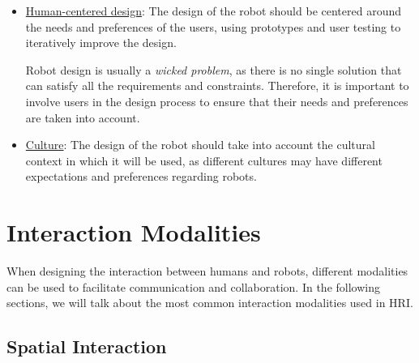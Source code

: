 \begin{itemize}
    Lastly, the \emph{interaction should expand the functionality} of the robot beyond its initial design. For example, a robot designed for cleaning may also be able to provide companionship and social interaction.

    \item \ul{Human-centered design}: The design of the robot should be centered around the needs and preferences of the users, using prototypes and user testing to iteratively improve the design.
    
    Robot design is usually a \emph{wicked problem}, as there is no single solution that can satisfy all the requirements and constraints. Therefore, it is important to involve users in the design process to ensure that their needs and preferences are taken into account.
    \item \ul{Culture}: The design of the robot should take into account the cultural context in which it will be used, as different cultures may have different expectations and preferences regarding robots.
\end{itemize}

\section{Interaction Modalities}

When designing the interaction between humans and robots, different modalities can be used to facilitate communication and collaboration. In the following sections, we will talk about the most common interaction modalities used in HRI.

\subsection{Spatial Interaction}


